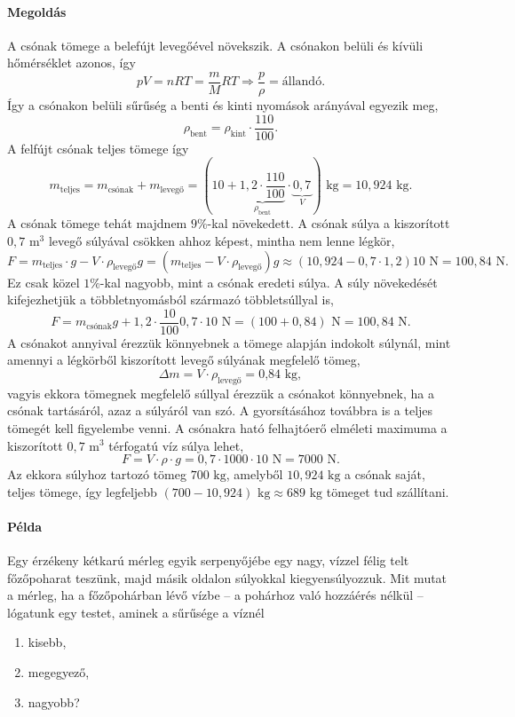 \documentclass[12pt,a4paper]{scrartcl}
\begin{document}
\paragraph{Megoldás}
A csónak tömege a belefújt levegőével növekszik. A csónakon belüli és kívüli hőmérséklet azonos, így
\[pV = nRT = \frac{m}{M}RT \Rightarrow \frac{p}{\rho } = {\text{állandó}}.\]
Így a csónakon belüli sűrűség a benti és kinti nyomások arányával egyezik meg,
\[{\rho _{{\text{bent}}}} = {\rho _{{\text{kint}}}} \cdot \frac{{110}}{{100}}.\]
A felfújt csónak teljes tömege így
\[{m_{{\text{teljes}}}} = {m_\text{csónak}} + {m_\text{levegő}} = \left( {10 + \underbrace {1{,}2 \cdot \frac{{110}}{{100}}}_{{\rho _{{\text{bent}}}}} \cdot \underbrace {0{,}7}_V} \right){\text{ kg}} = 10{,}924{\text{ kg}}.\]
A csónak tömege tehát majdnem $9\%$-kal növekedett. A csónak súlya a kiszorított $0{,}7\text{ m}^3$ levegő súlyával csökken ahhoz képest, mintha nem lenne légkör,
\[F = {m_\text{teljes}} \cdot g - V \cdot {\rho _\text{levegő}}g = \left( {{m_\text{teljes}} - V \cdot {\rho _\text{levegő}}} \right)g \approx \left( {10{,}924 - 0{,}7 \cdot 1{,}2} \right)10{\text{ N}} = 100{,}84{\text{ N}}.\]
Ez csak közel $1\%$-kal nagyobb, mint a csónak eredeti súlya. A súly növekedését kifejezhetjük a többletnyomásból származó többletsúllyal is,
\[F = m_\text{csónak}g + 1{,}2 \cdot \frac{{10}}{{100}}0{,}7 \cdot 10{\text{ N}} = \left( {100 + 0{,}84} \right){\text{ N}} = 100{,}84{\text{ N}}.\]
A csónakot annyival érezzük könnyebnek a tömege alapján indokolt súlynál, mint amennyi a légkörből kiszorított levegő súlyának megfelelő tömeg,
\[\Delta m = V \cdot {\rho _\text{levegő}} = {\text{0{,}84 kg}},\]
vagyis ekkora tömegnek megfelelő súllyal érezzük a csónakot könnyebnek, ha a csónak tartásáról, azaz a súlyáról van szó. A gyorsításához továbbra is a teljes tömegét kell figyelembe venni. A csónakra ható felhajtóerő elméleti maximuma a kiszorított $0{,}7\text{ m}^3$ térfogatú víz súlya lehet,
\[F = V \cdot \rho  \cdot g = 0,7 \cdot 1000 \cdot 10{\text{ N}} = 7000{\text{ N}}.\]
Az ekkora súlyhoz tartozó tömeg $700\text{ kg}$, amelyből $10{,}924{\text{ kg}}$ a csónak saját, teljes tömege, így legfeljebb $\left( {700 - 10,924} \right){\text{ kg}} \approx 689{\text{ kg}}$ tömeget tud szállítani.

\paragraph{Példa}
Egy érzékeny kétkarú mérleg egyik serpenyőjébe egy nagy, vízzel félig telt főzőpoharat teszünk, majd másik oldalon súlyokkal kiegyensúlyozzuk. Mit mutat a mérleg, ha a főzőpohárban lévő vízbe -- a pohárhoz való hozzáérés nélkül -- lógatunk egy testet, aminek a sűrűsége a víznél
\begin{enumerate}
\item kisebb,
\item megegyező,
\item nagyobb?
\end{enumerate}
\end{document}
